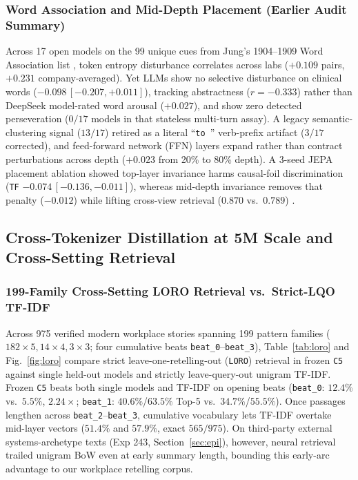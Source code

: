 \documentclass[conference]{IEEEtran}
\begin{document}
\subsubsection{Word Association and Mid-Depth Placement (Earlier Audit Summary)}
Across 17 open models on the 99 unique cues from Jung's 1904--1909 Word Association list \cite{jung1973experimental}, token entropy disturbance correlates across labs ($+0.109$ pairs, $+0.231$ company-averaged). Yet LLMs show no selective disturbance on clinical words ($-0.098\,[-0.207,+0.011]$), tracking abstractness ($r=-0.333$) rather than DeepSeek model-rated word arousal ($+0.027$), and show zero detected perseveration ($0/17$ models in that stateless multi-turn assay). A legacy semantic-clustering signal ($13/17$) retired as a literal ``\texttt{to }'' verb-prefix artifact ($3/17$ corrected), and feed-forward network (FFN) layers expand rather than contract perturbations across depth ($+0.023$ from 20\% to 80\% depth). A 3-seed JEPA placement ablation showed top-layer invariance harms causal-foil discrimination (\texttt{TF} $-0.074\,[-0.136,-0.011]$), whereas mid-depth invariance removes that penalty ($-0.012$) while lifting cross-view retrieval ($0.870$ vs.\ $0.789$) \cite{huang2025llmjepa,cheng2026platoskey}.

\subsection{Cross-Tokenizer Distillation at 5M Scale and Cross-Setting Retrieval}
\label{sec:distill}
\subsubsection{199-Family Cross-Setting LORO Retrieval vs.\ Strict-LQO TF-IDF}
Across 975 verified modern workplace stories spanning 199 pattern families ($182\times5, 14\times4, 3\times3$; four cumulative beats \texttt{beat\_0}--\texttt{beat\_3}), Table~\ref{tab:loro} and Fig.~\ref{fig:loro} compare strict leave-one-retelling-out (\texttt{LORO}) retrieval in frozen \texttt{C5} against single held-out models and strictly leave-query-out unigram TF-IDF. Frozen \texttt{C5} beats both single models and TF-IDF on opening beats (\texttt{beat\_0}: $12.4\%$ vs.\ $5.5\%$, $2.24\times$; \texttt{beat\_1}: $40.6\%$/$63.5\%$ Top-5 vs.\ $34.7\%$/$55.5\%$). Once passages lengthen across \texttt{beat\_2}--\texttt{beat\_3}, cumulative vocabulary lets TF-IDF overtake mid-layer vectors ($51.4\%$ and $57.9\%$, exact $565/975$). On third-party external systems-archetype texts (Exp 243, Section~\ref{sec:epi}), however, neural retrieval trailed unigram BoW even at early summary length, bounding this early-arc advantage to our workplace retelling corpus.
\end{document}
